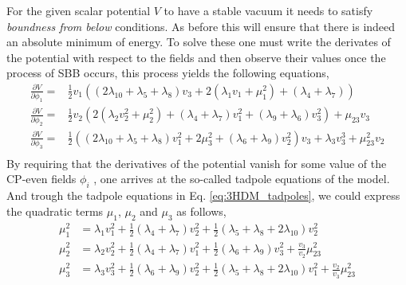 For the given scalar potential $V$ to have a stable vacuum it needs to satisfy \textit{boundness from below} conditions. 
%
As before this will ensure that there is indeed an absolute minimum of energy. 
%
To solve these one must write the derivates of the potential with respect to the fields and then observe their values once the process of SBB occurs, this process yields the following equations,
%
\begin{equation}
\label{eq:3HDM_tadpoles}
\begin{split}
\frac{\partial V}{\partial \phi_1} = & \frac{1}{2} v_1 \left( \left( 2 \lambda_{10} + \lambda_5 + \lambda_8 \right) v_3 + 2 \left( \lambda_1 v_1 + \mu_1^2 \right) + \left( \lambda_4 + \lambda_7 \right)  \right)  \\ 
\frac{\partial V}{\partial \phi_2} = & \frac{1}{2} v_2 \left( 2\left( \lambda_2 v_2^2 + \mu_2^2 \right) + \left( \lambda_4 + \lambda_7 \right) v_1^2 + \left( \lambda_9 + \lambda_6 \right)v_3^2 \right) + \mu_{23} v_3 \\
\frac{\partial V}{\partial \phi_3} = & \frac{1}{2} \left( \left( 2 \lambda_{10} + \lambda_5 + \lambda_8  \right) v_1^2  + 2 \mu_3^2 + \left( \lambda_6 + \lambda_9 \right) v_2^2 \right) v_3 + \lambda_3 v_3^3 + \mu_{23}^2 v_2 \\
\end{split} 
\end{equation}
%
By requiring that the derivatives of the potential vanish for some value of the CP-even fields $\phi_i$ , one arrives at the so-called tadpole equations of the model.
%
And trough the tadpole equations in Eq. \ref{eq:3HDM_tadpoles}, we could express the quadratic terms $\mu_1$, $\mu_2$ and $\mu_3$ as follows, 
%
\begin{equation}
\label{eq:3HDM_Param_1}
\begin{split}
\mu_1^2 & = \lambda_1 v_1^2 + \frac{1}{2} \left( \lambda_4 + \lambda_7 \right) v^2_2 + \frac{1}{2} \left( \lambda_5 + \lambda_8 + 2 \lambda_{10} \right) v_2^2  \\ 
\mu_2^2 & = \lambda_2 v_2^2 + \frac{1}{2} \left( \lambda_4 + \lambda_7 \right) v_1^2 + \frac{1}{2} \left( \lambda_6 + \lambda_9 \right) v_3^2 +\frac{v_3}{v_2} \mu^2_{23}  \\
\mu_3^2 & = \lambda_3 v^2_3  + \frac{1}{2}\left( \lambda_6 + \lambda_9 \right) v^2_2 + \frac{1}{2} \left( \lambda_5 + \lambda_8 + 2 \lambda_{10} \right)v_1^2 + \frac{v_2}{v_3} \mu_{23}^2 
\end{split}  
\end{equation}
